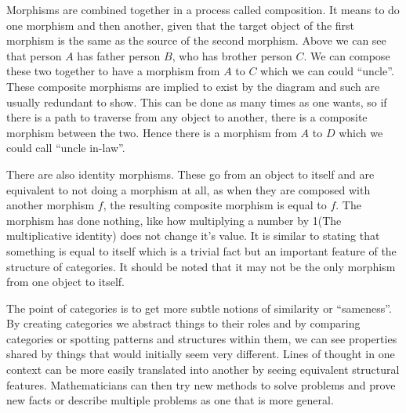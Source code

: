 \documentclass[10pt,a4paper,reqno]{amsart}
\begin{document}
Morphisms are combined together in a process called composition.  It means to do
one morphism and then another, given that the target object of the first
morphism is the same as the source of the second morphism.  Above we can see
that person $A$ has father person $B$, who has brother person $C$.  We can
compose these two together to have a morphism from $A$ to $C$ which we can could
``uncle''.  These composite morphisms are implied to exist by the diagram and
such are usually redundant to show.  This can be done as many times as one
wants, so if there is a path to traverse from any object to another, there is a
composite morphism between the two.  Hence there is a morphism from $A$ to $D$
which we could call ``uncle in-law''.

There are also identity morphisms.  These go from an object to itself and are
equivalent to not doing a morphism at all, as when they are composed with
another morphism $f$, the resulting composite morphism is equal to $f$.  The
morphism has done nothing, like how multiplying a number by 1(The multiplicative
identity) does not change it's value.  It is similar to stating that something
is equal to itself which is a trivial fact but an important feature of the
structure of categories.  It should be noted that it may not be the only
morphism from one object to itself.

The point of categories is to get more subtle notions of similarity or
``sameness''.
By creating categories we abstract things to their roles and by comparing
categories or spotting patterns and structures within them, we can see
properties shared by things that would initially seem very different.  Lines of
thought in one context can be more easily translated into another by seeing
equivalent structural features.  Mathematicians can then try new methods to
solve problems and prove new facts or describe multiple problems as one that is
more general.
\end{document}
